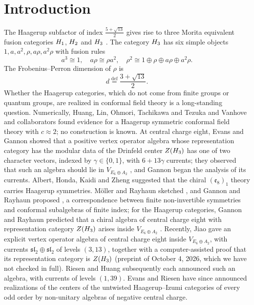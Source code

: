 \documentclass[leqno]{article}
\let\cal\relax
\newcommand{\cal}{\mathcal}
\newcommand{\ov}{\overset}
\numberwithin{equation}{section}
\begin{document}
{
  \hypersetup{linkcolor=blue}
 \tableofcontents
}

\section{Introduction}
\label{sec:Introduction}

The Haagerup subfactor of index $\frac{5+\sqrt{13}}{2}$ \cite{AsH99} gives rise to three Morita equivalent fusion categories $\cal H_1$, $\cal H_2$ and $\cal H_3$ \cite{GrS12}. The category $\cal H_3$ has six simple objects $1,a,a^2,\rho,a\rho,a^2\rho$ with fusion rules
\begin{equation}
\label{eq:fusion-rules}
a^3 \cong 1,\quad a\rho \cong \rho a^2,\quad \rho^2 \cong 1 \oplus \rho \oplus a\rho \oplus a^2\rho.
\end{equation}
The Frobenius--Perron dimension of $\rho$ is
\begin{equation}
\label{eq:d}
d \ov{\mathrm{def}}{=} \frac{3+\sqrt{13}}{2}.
\end{equation}
Whether the Haagerup categories, which do not come from finite groups or quantum groups, are realized in conformal field theory is a long-standing question. Numerically, Huang, Lin, Ohmori, Tachikawa and Tezuka \cite{HL+22} and Vanhove and collaborators \cite{V+22} found evidence for a Haagerup symmetric conformal field theory with $c \approx 2$; no construction is known. At central charge eight, Evans and Gannon \cite{EvG11} showed that a positive vertex operator algebra whose representation category has the modular data of the Drinfeld center $Z(\cal H_3)$ has one of two character vectors, indexed by $\gamma \in \{0,1\}$, with $6+13\gamma$ currents; they observed that such an algebra should lie in $V_{E_6 \oplus A_2}$ \cite[Section 2.4]{EvG11}, and Gannon \cite{Gan19} began the analysis of its currents. Albert, Honda, Kaidi and Zheng \cite{AHKZ26} suggested that the chiral $(\mathfrak e_8)_1$ theory carries Haagerup symmetries. Möller and Rayhaun sketched \cite{MoR24}, and Gannon and Rayhaun proposed \cite{GaR26}, a correspondence between finite non-invertible symmetries and conformal subalgebras of finite index; for the Haagerup categories, Gannon and Rayhaun predicted that a chiral algebra of central charge eight with representation category $Z(\cal H_3)$ arises inside $V_{E_6 \oplus A_2}$ \cite[Section 4.3]{GaR26}. Recently, Jiao \cite{Jia26} gave an explicit vertex operator algebra of central charge eight inside $V_{E_6 \oplus A_2}$, with currents $\mathfrak{sl}_2 \oplus \mathfrak{sl}_2$ of levels $(3,13)$, together with a computer-assisted proof that its representation category is $Z(\cal H_3)$ (preprint of October 4, 2026, which we have not checked in full). Riesen \cite{Rie26} and Huang \cite{Hua26} subsequently each announced such an algebra, with currents of levels $(1,39)$. Evans and Riesen \cite{EvR26} have since announced realizations of the centers of the untwisted Haagerup--Izumi categories of every odd order by non-unitary algebras of negative central charge.
\end{document}
